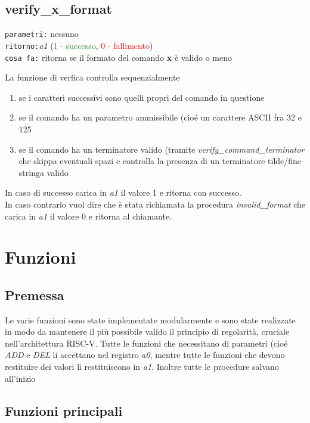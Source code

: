\documentclass[11pt]{report}
\begin{document}
    \section{verify\_\textbf{x}\_format}
    
    \begin{mdframed}
        \texttt{parametri:} nessuno \\
         \texttt{ritorno:}\textit{a1}  (\textcolor{ForestGreen}{1 - successo}, \textcolor{Red}{0 - fallimento})\\
         \texttt{cosa fa:} ritorna se il formato del comando \textbf{x} è valido o meno

    \end{mdframed}
    La funzione di verfica controlla sequenzialmente
    \begin{enumerate}
        \item se i caratteri successivi sono quelli propri del comando in questione
        \item se il comando ha un parametro ammissibile (cioé un carattere ASCII fra 32 e 125
        \item se il comando ha un terminatore valido (tramite \textit{verify\_command\_terminator} che skippa eventuali spazi e controlla la presenza di un terminatore tilde/fine stringa valido 
        
    \end{enumerate}
    In caso di successo carica in \textit{a1} il valore 1 e ritorna con successo.\\
    In caso contrario vuol dire che è stata richiamata la procedura \textit{invalid\_format} che carica in \textit{a1} il valore 0 e ritorna al chiamante.
    \newpage
    \chapter{Funzioni}
    \section{Premessa}
    Le varie funzioni sono state implementate modularmente e sono state realizzate in modo da mantenere il più possibile valido il principio di regolarità, cruciale nell'architettura RISC-V. Tutte le funzioni che necessitano di parametri (cioé \textit{ADD} e \textit{DEL} li accettano nel registro \textit{a0}, mentre tutte le funzioni che devono restituire dei valori li restituiscono in \textit{a1}. Inoltre tutte le procedure salvano all'inizio

    \section{Funzioni principali}
\end{document}
